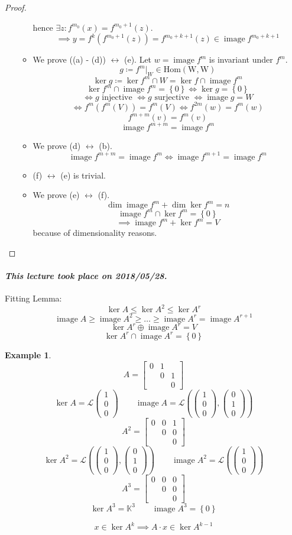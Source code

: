 \documentclass{article}
\newtheorem{example}{Example}  \numberwithin{example}{section}
\newcommand{\set}[1]{\left\{#1\right\}}
\newcommand{\dateref}[1]{\paragraph{\textit{This lecture took place on #1.}}}
\newcommand{\vecthree}[3]{\begin{pmatrix} #1 \\ #2 \\ #3 \end{pmatrix}}
\DeclareMathOperator{\im}{image}
\begin{document}
\begin{proof}
\begin{enumerate}
\begin{itemize}
          hence $\exists z: f^{m_0}(x) = f^{m_0 + 1}(z)$.
          \[ \implies y = f^k(f^{m_0 + 1}(z)) = f^{m_0 + k + 1}(z) \in \im{f^{m_0 + k + 1}} \]
        \item We prove ((a) - (d)) $\leftrightarrow$ (e).
          Let $w = \im{f^m}$ is invariant under $f^m$.
          \[ g \coloneqq f^m|_W \in \operatorname{Hom(W, W)} \]
          \[ \ker{g} \coloneqq \ker{f^m} \cap W = \ker{f} \cap \im{f^m} \]
          \[ \ker{f^m} \cap \im{f^m} = \set{0} \iff \ker{g} = \set{0} \]
          \[ \iff g \text{ injective } \iff g \text{ surjective } \iff \im{g} = W \]
          \[ \iff f^m(f^m(V)) = f^m(V) \iff f^{2m}(w) = f^m(w) \]
          \[ f^{m+m}(v) = f^m(v) \]
          \[ \im{f^{m+m}} = \im{f^m} \]
        \item We prove (d) $\leftrightarrow$ (b).
          \[ \im{f^{m+m}} = \im{f^m} \iff \im{f^{m+1}} = \im{f^m} \]
        \item (f) $\leftrightarrow$ (e) is trivial.
        \item We prove (e) $\leftrightarrow$ (f).
          \[ \dim\im{f^m} + \dim\ker{f^m} = n \]
          \[ \im{f^m} \cap \ker{f^m} = \set{0} \]
          \[ \implies \im{f^m} + \ker{f^m} = V \]
          because of dimensionality reasons.
      \end{itemize}
  \end{enumerate}
\end{proof}

\dateref{2018/05/28}

Fitting Lemma:
\[ \ker{A} \leq \ker{A^2} \leq \ker{A^r} \]
\[ \im{A} \geq \im{A^2} \geq \dots \geq \im{A^r} = \im{A^{r+1}} \]
\[ \ker{A^r} \oplus \im{A^r} = V \]
\[ \ker{A^r} \cap \im{A^r} = \set{0} \]

\begin{example} %
  \[ A = \begin{bmatrix} 0 & 1 & \\ & 0 & 1 \\ & &  0 \end{bmatrix} \]
  \[ \ker{A} = \mathcal L\vecthree 100 \qquad \im{A} = \mathcal L\left(\vecthree 100, \vecthree 010\right) \]
  \[ A^2 = \begin{bmatrix} 0 & 0 & 1 \\ & 0 & 0 \\ & &  0 \end{bmatrix} \]
  \[ \ker{A^2} = \mathcal L\left(\vecthree 100, \vecthree 010\right)\qquad \im{A^2} = \mathcal L\left(\vecthree 100\right) \]
  \[ A^3 = \begin{bmatrix} 0 & 0 & 0 \\ & 0 & 0 \\ & &  0 \end{bmatrix} \]
  \[ \ker{A^3} = \mathbb K^3 \qquad \im{A^3} = \set{0} \]

  \[ x \in \ker{A^k} \implies A \cdot x \in \ker{A^{k-1}} \]
\end{example}
\end{document}
